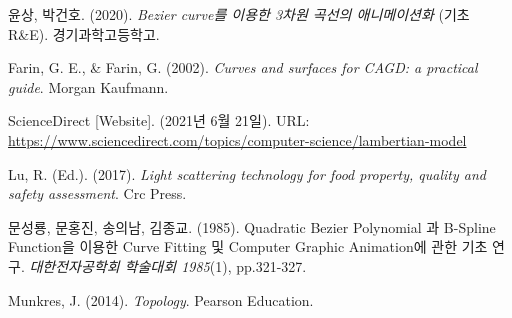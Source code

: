 \documentclass[10pt]{gshs-report-v2.0}
\theoremstyle{theorem}
\theoremstyle{lemma}
\theoremstyle{definition}
\begin{document}
\begin{thebibliography}{99}
 윤상, 박건호. (2020). \emph{Bezier curve를 이용한 3차원 곡선의 애니메이션화} (기초 R\&E). 경기과학고등학고.
	
 Farin, G. E., \& Farin, G. (2002). \emph{Curves and surfaces for CAGD: a practical guide}. Morgan Kaufmann.

 ScienceDirect [Website]. (2021년 6월 21일). URL: \url{https://www.sciencedirect.com/topics/computer-science/lambertian-model}

 Lu, R. (Ed.). (2017). \emph{Light scattering technology for food property, quality and safety assessment}. Crc Press.

 문성룡, 문홍진, 송의남, 김종교. (1985). Quadratic Bezier Polynomial 과 B-Spline Function을 이용한 Curve Fitting 및 Computer Graphic Animation에 관한 기초 연구. \emph{대한전자공학회 학술대회 1985}(1), pp.321-327.

 Munkres, J. (2014). \emph{Topology}. Pearson Education.

\end{thebibliography}
\end{document}
